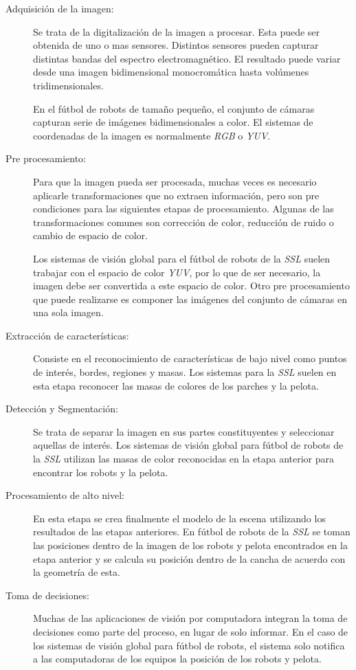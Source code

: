 \begin{description}

	\item[Adquisición de la imagen:] Se trata de la digitalización de la
		imagen a procesar. Esta puede ser obtenida de uno o mas
		sensores. Distintos sensores pueden capturar distintas bandas
		del espectro electromagnético. El resultado puede variar desde
		una imagen bidimensional monocromática hasta volúmenes
		tridimensionales.
	
		En el fútbol de robots de tamaño pequeño, el conjunto de cámaras
		capturan serie de imágenes bidimensionales a color. El sistemas
		de coordenadas de la imagen es normalmente \emph{RGB} o
		\emph{YUV}.

	\item[Pre procesamiento:] Para que la imagen pueda ser procesada, muchas
		veces es necesario aplicarle transformaciones que no extraen
		información, pero son pre condiciones para las siguientes etapas
		de procesamiento. Algunas de las transformaciones comunes son
		corrección de color, reducción de ruido o cambio de espacio de
		color.

		Los sistemas de visión global para el fútbol de robots de la
		\emph{SSL} suelen trabajar con el espacio de color \emph{YUV},
		por lo que de ser necesario, la imagen debe ser convertida a
		este espacio de color. Otro pre procesamiento que puede
		realizarse es componer las imágenes del conjunto de cámaras en
		una sola imagen.

	\item[Extracción de características:] Consiste en el reconocimiento de
		características de bajo nivel como puntos de interés, bordes,
		regiones y masas. Los sistemas para la \emph{SSL} suelen en esta
		etapa reconocer las masas de colores de los parches y la pelota.

	\item[Detección y Segmentación:] Se trata de separar la imagen en sus
		partes constituyentes y seleccionar aquellas de interés. Los
		sistemas de visión global para fútbol de robots de la \emph{SSL}
		utilizan las masas de color reconocidas en la etapa anterior
		para encontrar los robots y la pelota.

	\item[Procesamiento de alto nivel:] En esta etapa se crea finalmente el
		modelo de la escena utilizando los resultados de las etapas
		anteriores. En fútbol de robots de la \emph{SSL} se toman las
		posiciones dentro de la imagen de los robots y pelota
		encontrados en la etapa anterior y se calcula su posición dentro
		de la cancha de acuerdo con la geometría de esta.

	\item[Toma de decisiones:] Muchas de las aplicaciones de visión por
		computadora integran la toma de decisiones como parte del
		proceso, en lugar de solo informar. En el caso de los sistemas
		de visión global para fútbol de robots, el sistema solo notifica
		a las computadoras de los equipos la posición de los robots y
		pelota.

\end{description}
